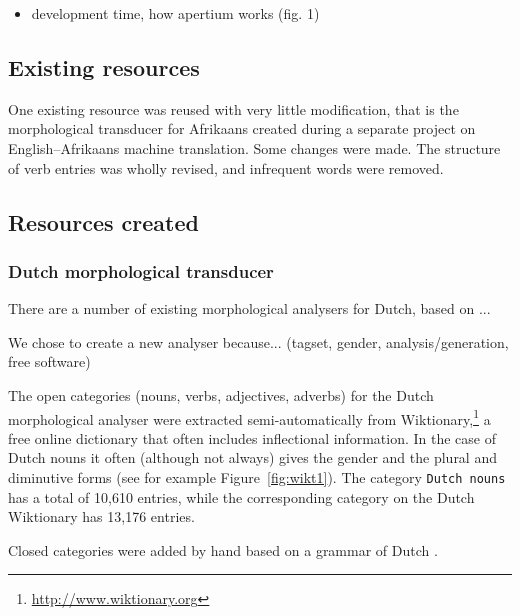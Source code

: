 \documentclass[11pt]{article}
\begin{document}
\begin{itemize}
\item development time, how apertium works (fig. 1)
\end{itemize}

\subsection{Existing resources}

One existing resource was reused with very little modification, that is the 
morphological transducer for Afrikaans created during a separate project on English--Afrikaans
machine translation. Some changes were made. The structure of verb entries
was wholly revised, and infrequent words were removed.

\subsection{Resources created}

\subsubsection{Dutch morphological transducer}

There are a number of existing morphological analysers for Dutch, based on ...

We chose to create a new analyser because... (tagset, gender, analysis/generation, free software)

The open categories (nouns, verbs, adjectives, adverbs) for the Dutch 
morphological analyser were extracted semi-automatically from 
Wiktionary,\footnote{\url{http://www.wiktionary.org}} a free online 
dictionary that often includes inflectional information. In the case 
of Dutch nouns it often (although not always) gives the gender and the 
plural and diminutive forms (see for example Figure~\ref{fig:wikt1}).
The category {\small {\tt Dutch nouns}} has a total of 10,610 entries,
while the corresponding category on the Dutch Wiktionary has 13,176 entries.

Closed categories were added by hand based on a grammar of Dutch \cite{Shetter:02}.
\end{document}
